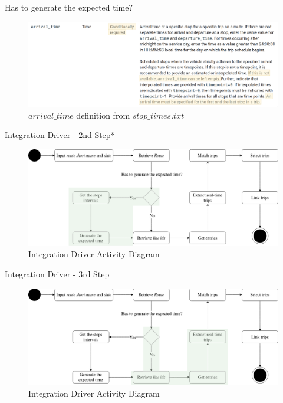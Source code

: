 \documentclass[xcolor=dvipsnames,table]{beamer}
\begin{document}
\begin{frame}{Has to generate the expected time?}
        \begin{figure}[H]
                \centering
                \includegraphics[width = \textwidth]{images/arrival_time_def.png}
                \caption{$arrival\_time$ definition from $stop\_times.txt$}
        \end{figure}
\end{frame}
\begin{frame}{Integration Driver - 2nd Step*}
        \begin{figure}[H]
                \centering
                \includegraphics[width = \textwidth]{images/integrationDriverAD(2nd_step).png}
                \caption{Integration Driver Activity Diagram}
        \end{figure}
\end{frame}


\begin{frame}{Integration Driver - 3rd Step}
        \begin{figure}[H]
                \centering
                \includegraphics[width = \textwidth]{images/integrationDriverAD(3rd_step).png}
                \caption{Integration Driver Activity Diagram}
        \end{figure}
\end{frame}
\end{document}
